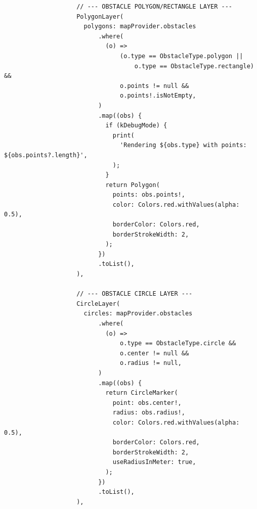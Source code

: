 \begin{lstlisting}
                    // --- OBSTACLE POLYGON/RECTANGLE LAYER ---
                    PolygonLayer(
                      polygons: mapProvider.obstacles
                          .where(
                            (o) =>
                                (o.type == ObstacleType.polygon ||
                                    o.type == ObstacleType.rectangle) &&
                                o.points != null &&
                                o.points!.isNotEmpty,
                          )
                          .map((obs) {
                            if (kDebugMode) {
                              print(
                                'Rendering ${obs.type} with points: ${obs.points?.length}',
                              );
                            }
                            return Polygon(
                              points: obs.points!,
                              color: Colors.red.withValues(alpha: 0.5),
                              borderColor: Colors.red,
                              borderStrokeWidth: 2,
                            );
                          })
                          .toList(),
                    ),

                    // --- OBSTACLE CIRCLE LAYER ---
                    CircleLayer(
                      circles: mapProvider.obstacles
                          .where(
                            (o) =>
                                o.type == ObstacleType.circle &&
                                o.center != null &&
                                o.radius != null,
                          )
                          .map((obs) {
                            return CircleMarker(
                              point: obs.center!,
                              radius: obs.radius!,
                              color: Colors.red.withValues(alpha: 0.5),
                              borderColor: Colors.red,
                              borderStrokeWidth: 2,
                              useRadiusInMeter: true,
                            );
                          })
                          .toList(),
                    ),


\end{lstlisting}
